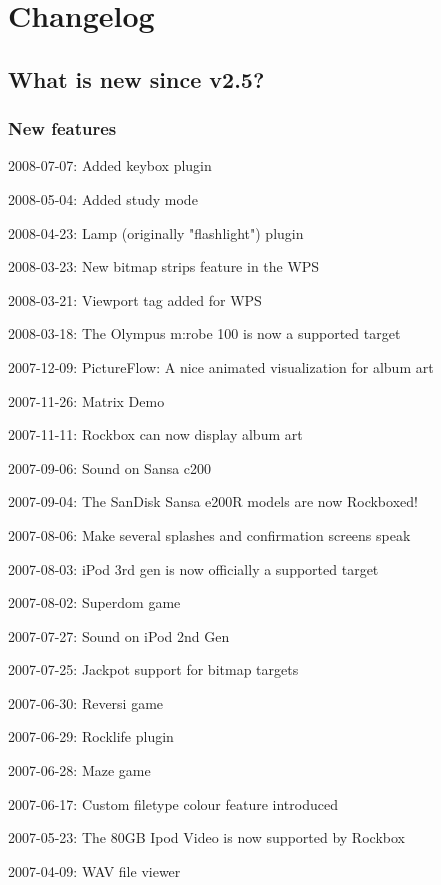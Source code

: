 \chapter{\label{ref:changelog}Changelog}
\section{What is new since v2.5?}

\subsection{New features}
\begin{changelog}
\item 2008-07-07: Added keybox plugin
\item 2008-05-04: Added study mode
\item 2008-04-23: Lamp (originally "flashlight") plugin
\item 2008-03-23: New bitmap strips feature in the WPS
\item 2008-03-21: Viewport tag added for WPS
\item 2008-03-18: The Olympus m:robe 100 is now a supported target
\item 2007-12-09: PictureFlow: A nice animated visualization for album art
\item 2007-11-26: Matrix Demo
\item 2007-11-11: Rockbox can now display album art
\item 2007-09-06: Sound on Sansa c200
\item 2007-09-04: The SanDisk Sansa e200R models are now Rockboxed!
\item 2007-08-06: Make several splashes and confirmation screens speak
\item 2007-08-03: iPod 3rd gen is now officially a supported target 
\item 2007-08-02: Superdom game
\item 2007-07-27: Sound on iPod 2nd Gen
\item 2007-07-25: Jackpot support for bitmap targets
\item 2007-06-30: Reversi game
\item 2007-06-29: Rocklife plugin
\item 2007-06-28: Maze game
\item 2007-06-17: Custom filetype colour feature introduced 
\item 2007-05-23: The 80GB Ipod Video is now supported by Rockbox
\item 2007-04-09: WAV file viewer

\end{changelog}
